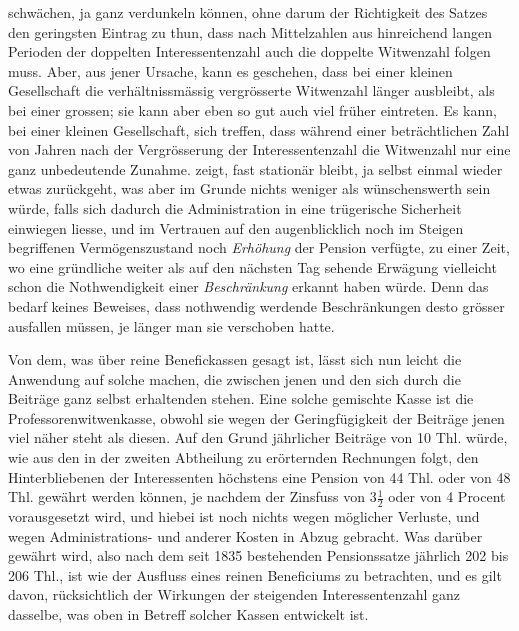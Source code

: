 schwächen, ja ganz verdunkeln können, ohne darum der Richtigkeit des Satzes den geringsten Eintrag zu thun, dass nach Mittelzahlen aus hinreichend langen Perioden der doppelten Interessentenzahl auch die doppelte Witwenzahl folgen muss. Aber, aus jener Ursache, kann es geschehen, dass bei einer kleinen Gesellschaft die verhältnissmässig vergrösserte Witwenzahl länger ausbleibt, als bei einer grossen; sie kann aber eben so gut auch viel früher eintreten. Es kann, bei einer kleinen Gesellschaft, sich treffen, dass während einer beträchtlichen Zahl von Jahren nach der Vergrösserung der Interessentenzahl die Witwenzahl nur eine ganz unbedeutende Zunahme. zeigt, fast stationär bleibt, ja selbst einmal wieder etwas zurückgeht, was aber im Grunde nichts weniger als wünschenswerth sein würde, falls sich dadurch die Administration in eine trügerische Sicherheit einwiegen liesse, und im Vertrauen auf den augenblicklich noch im Steigen begriffenen Vermögenszustand noch \textit{Erhöhung} der Pension verfügte, zu einer Zeit, wo eine gründliche weiter als auf den nächsten Tag sehende Erwägung vielleicht schon die Nothwendigkeit einer \textit{Beschränkung} erkannt haben würde. Denn das bedarf keines Beweises, dass nothwendig werdende Beschränkungen desto grösser ausfallen müssen, je länger man sie verschoben hatte.

Von dem, was über reine Benefickassen gesagt ist, lässt sich nun leicht die Anwendung auf solche machen, die zwischen jenen und den sich durch die Beiträge ganz selbst erhaltenden stehen. Eine solche gemischte Kasse ist die Professorenwitwenkasse, obwohl sie wegen der Geringfügigkeit der Beiträge jenen viel näher steht als diesen. Auf den Grund jährlicher Beiträge von 10 Thl. würde, wie aus den in der zweiten Abtheilung zu erörternden Rechnungen folgt, den Hinterbliebenen der Interessenten höchstens eine Pension von 44 Thl. oder von 48 Thl. gewährt werden können, je nachdem der Zinsfuss von \(3\tfrac12\) oder von 4 Procent vorausgesetzt wird, und hiebei ist noch nichts wegen möglicher Verluste, und wegen Administrations- und anderer Kosten in Abzug gebracht. Was darüber gewährt wird, also nach dem seit 1835 bestehenden Pensionssatze jährlich 202 bis 206 Thl., ist wie der Ausfluss eines reinen Beneficiums zu betrachten, und es gilt davon, rücksichtlich der Wirkungen der steigenden Interessentenzahl ganz dasselbe, was oben in Betreff solcher Kassen entwickelt ist.

